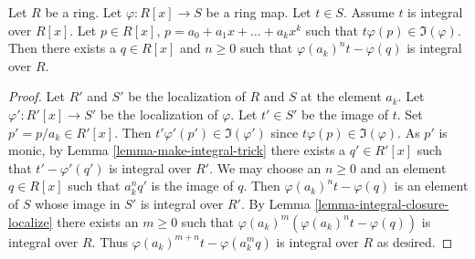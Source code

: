 \begin{lemma}
\label{lemma-combine-lemmas}
Let $R$ be a ring. Let $\varphi : R[x] \to S$ be
a ring map. Let $t \in S$. Assume $t$ is integral
over $R[x]$. Let $p \in R[x]$, $p = a_0 + a_1x + \ldots +
a_k x^k$ such that $t \varphi(p) \in \Im(\varphi)$.
Then there exists a $q \in R[x]$ and $n \geq 0$
such that $\varphi(a_k)^n t - \varphi(q)$ is integral
over $R$.
\end{lemma}

\begin{proof}
Let $R'$ and $S'$ be the localization of $R$ and $S$ at the element $a_k$.
Let $\varphi' : R'[x] \to S'$ be the localization of $\varphi$.
Let $t' \in S'$ be the image of $t$. Set $p' = p/a_k \in R'[x]$.
Then $t' \varphi'(p') \in \Im(\varphi')$ since $t \varphi(p) \in \Im(\varphi)$.
As $p'$ is monic, by
Lemma \ref{lemma-make-integral-trick} there exists a $q' \in R'[x]$
such that $t' - \varphi'(q')$ is integral over $R'$.
We may choose an $n \geq 0$ and an element $q \in R[x]$
such that $a_k^n q'$ is the image of $q$.
Then $\varphi(a_k)^n t - \varphi(q)$ is an element of $S$ whose
image in $S'$ is integral over $R'$.
By Lemma \ref{lemma-integral-closure-localize}
there exists an $m \geq 0$ such that
$\varphi(a_k)^m(\varphi(a_k)^n t - \varphi(q))$ is integral over $R$.
Thus $\varphi(a_k)^{m + n}t - \varphi(a_k^m q)$
is integral over $R$ as desired.
\end{proof}
